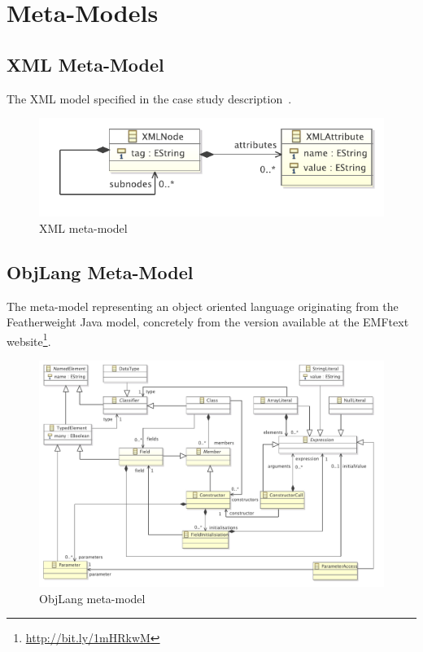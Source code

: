 
\section{Meta-Models}
\label{sec:AppendixMetaModels}


\subsection{XML Meta-Model}

The XML model specified in the case study description~\cite{Lano2014}.

\begin{figure}[h!bt]
  \centering
  \includegraphics[width=.6\textwidth]{figures/XMLMetaModel.pdf}
  \caption{XML meta-model}
  \label{fig:AppendixXMLMetaModel}
\end{figure}

\subsection{ObjLang Meta-Model}

The meta-model representing an object oriented language originating from the Featherweight Java model, concretely from the version available at the EMFtext website\footnote{\url{http://bit.ly/1mHRkwM}}.

\begin{figure}[h!bt]
  \centering
  \includegraphics[width=\textwidth]{figures/ObjLangMetaModel.pdf}
  \caption{ObjLang meta-model}
  \label{fig:AppendixObjLangMetaModel}
\end{figure}


